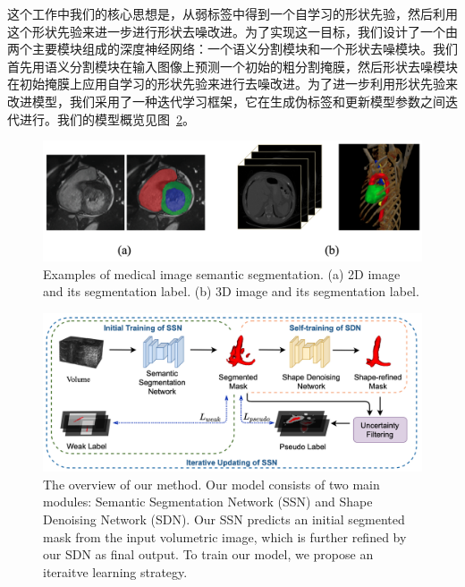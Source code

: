 这个工作中我们的核心思想是，从弱标签中得到一个自学习的形状先验，然后利用这个形状先验来进一步进行形状去噪改进。为了实现这一目标，我们设计了一个由两个主要模块组成的深度神经网络：一个语义分割模块和一个形状去噪模块。我们首先用语义分割模块在输入图像上预测一个初始的粗分割掩膜，然后形状去噪模块在初始掩膜上应用自学习的形状先验来进行去噪改进。为了进一步利用形状先验来改进模型，我们采用了一种迭代学习框架，它在生成伪标签和更新模型参数之间迭代进行。我们的模型概览见图~\ref{fig:model}。


    \begin{figure}[tbp]
        \centering 
        \includegraphics[width=1.0\textwidth]{img/c3/c3_1.png}
        {Examples of medical image semantic segmentation. (a) 2D image and its segmentation label. (b) 3D image and its segmentation label.}
        \label{c3_fig1}
    \end{figure}

    \begin{figure}[t!]
        \centering 
        \includegraphics[width=1.00\textwidth]{img/c3/b_model_shape.png}
        {The overview of our method. Our model consists of two main modules: Semantic Segmentation Network (SSN) and Shape Denoising Network (SDN). Our SSN predicts an initial segmented mask from the input volumetric image, which is further refined by our SDN as final output. To train our model, we propose an iteraitve learning strategy.}
        \label{fig:model}
    \end{figure}


